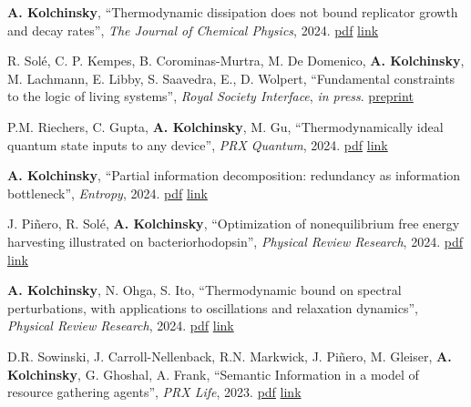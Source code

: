 
\newcommand{\pdflink}[1]{\href{https://artemyk.github.io/assets/pdf/papers/#1.pdf}{pdf}}
\newcommand{\publink}[1]{\href{#1}{link}}

\textbf{A. Kolchinsky}, ``Thermodynamic dissipation does not bound replicator growth and decay rates'', \emph{The Journal of Chemical Physics}, 2024. \pdflink{Kolchinsky_ThermodynamicDissipation_JCP_2024} \publink{https://pubs.aip.org/aip/jcp/article-abstract/161/12/124101/3313575/Thermodynamic-dissipation-does-not-bound} 

R. Solé, C. P. Kempes, B. Corominas-Murtra, M. De Domenico, \textbf{A. Kolchinsky}, M. Lachmann, E. Libby, S. Saavedra, E., D. Wolpert, ``Fundamental constraints to the logic of living systems'', \emph{Royal Society Interface}, \emph{in press}. \href{https://www.preprints.org/manuscript/202406.0891/v1}{preprint}

P.M. Riechers, C. Gupta, \textbf{A. Kolchinsky}, M. Gu, ``Thermodynamically ideal quantum state inputs to any device'', \emph{PRX Quantum}, 2024. \pdflink{Riechers_2024_ThermodynamicallyIdealInputs} \publink{https://journals.aps.org/prxquantum/abstract/10.1103/PRXQuantum.5.030318}

\textbf{A. Kolchinsky}, ``Partial information decomposition: redundancy as information bottleneck'', \emph{Entropy}, 2024. \pdflink{Kolchinsky_2024_PIDasIB} \publink{https://www.mdpi.com/1099-4300/26/7/546}

J. Piñero, R. Solé, \textbf{A. Kolchinsky}, ``Optimization of nonequilibrium free energy harvesting illustrated on bacteriorhodopsin'', \emph{Physical Review Research}, 2024. \pdflink{Pinero_Sole_Kolchinsky_2024_OptimizationOfFreeEnergyHarvesting} \publink{https://journals.aps.org/prresearch/abstract/10.1103/PhysRevResearch.6.013275}

\textbf{A. Kolchinsky}, N. Ohga, S. Ito, ``Thermodynamic bound on spectral perturbations, with applications to oscillations and relaxation dynamics'', \emph{Physical Review Research}, 2024. \pdflink{Kolchinsky_Ohga_Ito_ThermodynamicBoundOnSpectralPerturbations} \publink{https://journals.aps.org/prresearch/pdf/10.1103/PhysRevResearch.6.013082}

D.R. Sowinski, J. Carroll-Nellenback, R.N. Markwick, J. Piñero, M. Gleiser, \textbf{A. Kolchinsky}, G. Ghoshal, A. Frank, ``Semantic Information in a model of resource gathering agents'', \emph{PRX Life}, 2023. \pdflink{Sowinski-SemanticInformationInAModelOfResourceGatheringAgents} \publink{https://journals.aps.org/prxlife/abstract/10.1103/PRXLife.1.023003}

